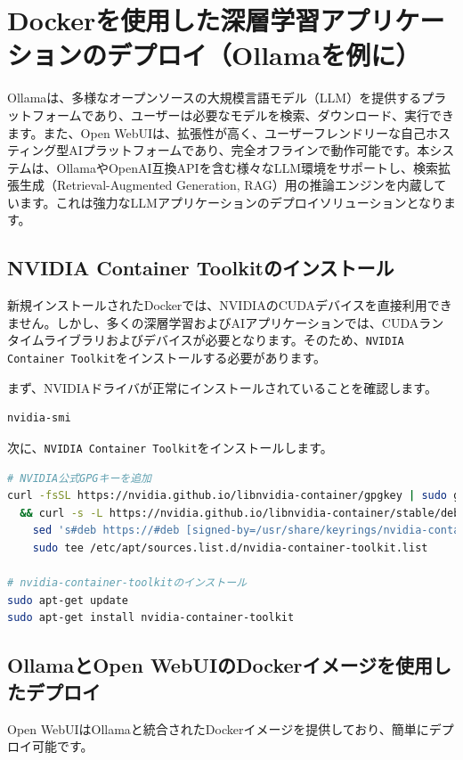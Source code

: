 \section{Dockerを使用した深層学習アプリケーションのデプロイ（Ollamaを例に）}
Ollamaは、多様なオープンソースの大規模言語モデル（LLM）を提供するプラットフォームであり、ユーザーは必要なモデルを検索、ダウンロード、実行できます。また、Open WebUIは、拡張性が高く、ユーザーフレンドリーな自己ホスティング型AIプラットフォームであり、完全オフラインで動作可能です。本システムは、OllamaやOpenAI互換APIを含む様々なLLM環境をサポートし、検索拡張生成（Retrieval-Augmented Generation, RAG）用の推論エンジンを内蔵しています。これは強力なLLMアプリケーションのデプロイソリューションとなります。

\subsection{NVIDIA Container Toolkitのインストール}
新規インストールされたDockerでは、NVIDIAのCUDAデバイスを直接利用できません。しかし、多くの深層学習およびAIアプリケーションでは、CUDAランタイムライブラリおよびデバイスが必要となります。そのため、\texttt{NVIDIA Container Toolkit}をインストールする必要があります。

まず、NVIDIAドライバが正常にインストールされていることを確認します。
\begin{lstlisting}[language=bash]
nvidia-smi
\end{lstlisting}

次に、\texttt{NVIDIA Container Toolkit}をインストールします。
\begin{lstlisting}[language=bash]
# NVIDIA公式GPGキーを追加
curl -fsSL https://nvidia.github.io/libnvidia-container/gpgkey | sudo gpg --dearmor -o /usr/share/keyrings/nvidia-container-toolkit-keyring.gpg \
  && curl -s -L https://nvidia.github.io/libnvidia-container/stable/deb/nvidia-container-toolkit.list | \
    sed 's#deb https://#deb [signed-by=/usr/share/keyrings/nvidia-container-toolkit-keyring.gpg] https://#g' | \
    sudo tee /etc/apt/sources.list.d/nvidia-container-toolkit.list

# nvidia-container-toolkitのインストール
sudo apt-get update
sudo apt-get install nvidia-container-toolkit
\end{lstlisting}

\subsection{OllamaとOpen WebUIのDockerイメージを使用したデプロイ}
Open WebUIはOllamaと統合されたDockerイメージを提供しており、簡単にデプロイ可能です。

